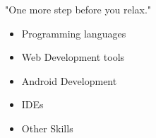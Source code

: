 
"One more step before you relax."
\medskip



\begin{itemize}
\item \textcolor{emphasis}{Programming languages} 
\end{itemize}
\divider\smallskip

\begin{itemize}
\item \textcolor{emphasis}{Web Development tools} 
\end{itemize}
\divider\smallskip

\begin{itemize}
\item \textcolor{emphasis}{Android Development} 
\end{itemize}
\divider\smallskip
 
 \begin{itemize}
\item \textcolor{emphasis}{IDEs} 
\end{itemize}
\divider\smallskip

\begin{itemize}
\item \textcolor{emphasis}{Other Skills} 
\end{itemize}
\divider\smallskip





